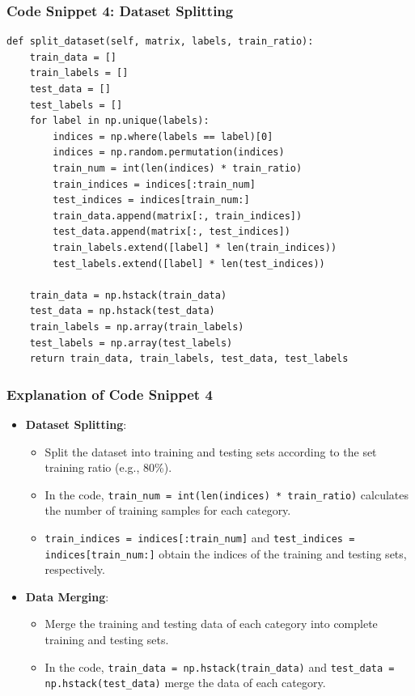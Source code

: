\documentclass{article}
\begin{document}
\subsubsection{Code Snippet 4: Dataset Splitting}
\begin{lstlisting}[basicstyle=\scriptsize\ttfamily, linewidth=\textwidth]
def split_dataset(self, matrix, labels, train_ratio):
    train_data = []
    train_labels = []
    test_data = []
    test_labels = []
    for label in np.unique(labels):
        indices = np.where(labels == label)[0]
        indices = np.random.permutation(indices)
        train_num = int(len(indices) * train_ratio)
        train_indices = indices[:train_num]
        test_indices = indices[train_num:]
        train_data.append(matrix[:, train_indices])
        test_data.append(matrix[:, test_indices])
        train_labels.extend([label] * len(train_indices))
        test_labels.extend([label] * len(test_indices))

    train_data = np.hstack(train_data)
    test_data = np.hstack(test_data)
    train_labels = np.array(train_labels)
    test_labels = np.array(test_labels)
    return train_data, train_labels, test_data, test_labels
\end{lstlisting}

\subsubsection{Explanation of Code Snippet 4}
\begin{itemize}
    \item \textbf{Dataset Splitting}:
    \begin{itemize}
        \item Split the dataset into training and testing sets according to the set training ratio (e.g., 80\%).
        \item In the code, \texttt{train\_num = int(len(indices) * train\_ratio)} calculates the number of training samples for each category.
        \item \texttt{train\_indices = indices[:train\_num]} and \texttt{test\_indices = indices[train\_num:]} obtain the indices of the training and testing sets, respectively.
    \end{itemize}
    \item \textbf{Data Merging}:
    \begin{itemize}
        \item Merge the training and testing data of each category into complete training and testing sets.
        \item In the code, \texttt{train\_data = np.hstack(train\_data)} and \texttt{test\_data = np.hstack(test\_data)} merge the data of each category.
    \end{itemize}
\end{itemize}
\end{document}
